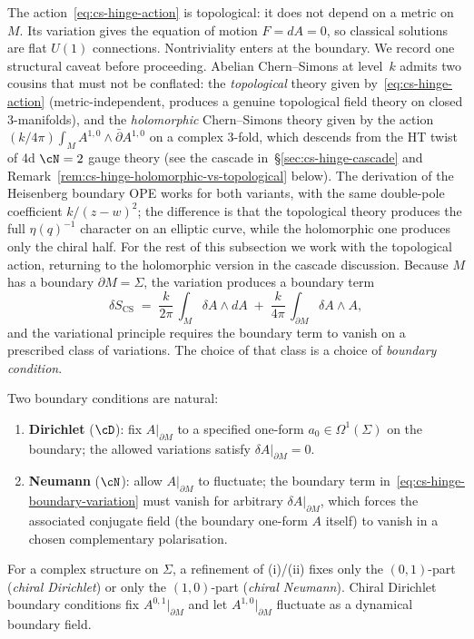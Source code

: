 The action~\eqref{eq:cs-hinge-action} is topological: it does not
depend on a metric on $M$. Its variation gives the equation of
motion $F = dA = 0$, so classical solutions are flat $U(1)$
connections. Nontriviality enters at the boundary.
We record one structural caveat before proceeding. Abelian
Chern--Simons at level~$k$ admits two cousins that must not be
conflated: the \emph{topological} theory given
by~\eqref{eq:cs-hinge-action} (metric-independent, produces a
genuine topological field theory on closed 3-manifolds), and the
\emph{holomorphic} Chern--Simons theory given by the action
$(k/4\pi)\int_M A^{1,0}\wedge \bar\partial A^{1,0}$ on a complex
3-fold, which descends from the HT twist of 4d $\cN = 2$ gauge
theory (see the cascade in~\S\ref{sec:cs-hinge-cascade} and
Remark~\ref{rem:cs-hinge-holomorphic-vs-topological} below). The
derivation of the Heisenberg boundary OPE works for both
variants, with the same double-pole coefficient $k/(z - w)^2$; the
difference is that the topological theory produces the full
$\eta(q)^{-1}$ character on an elliptic curve, while the
holomorphic one produces only the chiral half. For the rest of
this subsection we work with the topological action, returning to
the holomorphic version in the cascade discussion.
Because $M$ has a boundary $\partial M = \Sigma$, the variation
produces a boundary term
\begin{equation}\label{eq:cs-hinge-boundary-variation}
\delta S_{\mathrm{CS}}
\;=\;
\frac{k}{2\pi}\,
\int_M \delta A \wedge dA
\;+\;
\frac{k}{4\pi}\,
\int_{\partial M} \delta A \wedge A,
\end{equation}
and the variational principle requires the boundary term to vanish
on a prescribed class of variations. The choice of that class is a
choice of \emph{boundary condition}.

Two boundary conditions are natural:
\begin{enumerate}[label=\textup{(\roman*)}]
\item \textbf{Dirichlet} ($\cD$): fix $A|_{\partial M}$ to a
specified one-form $a_0 \in \Omega^1(\Sigma)$ on the boundary; the
allowed variations satisfy $\delta A|_{\partial M} = 0$.
\item \textbf{Neumann} ($\cN$): allow $A|_{\partial M}$ to fluctuate;
the boundary term in~\eqref{eq:cs-hinge-boundary-variation} must
vanish for arbitrary $\delta A|_{\partial M}$, which forces the
associated conjugate field (the boundary one-form $A$ itself) to
vanish in a chosen complementary polarisation.
\end{enumerate}
For a complex structure on $\Sigma$, a refinement of (i)/(ii) fixes
only the $(0,1)$-part (\emph{chiral Dirichlet}) or only the
$(1,0)$-part (\emph{chiral Neumann}). Chiral Dirichlet
boundary conditions fix $A^{0,1}|_{\partial M}$ and let
$A^{1,0}|_{\partial M}$ fluctuate as a dynamical boundary field.

